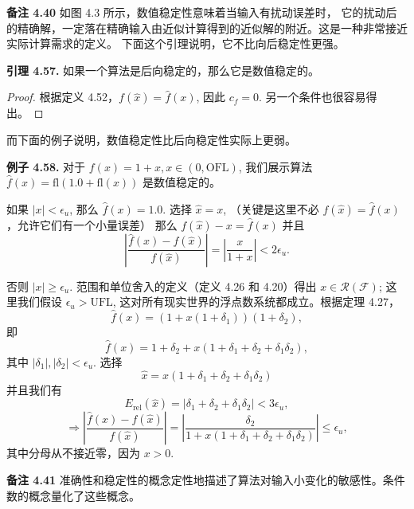 \documentclass[a4paper]{ctexart}
\begin{document}
{\noindent \textbf{备注 4.40 } 如图 4.3 所示，数值稳定性意味着当输入有扰动误差时，
它的扰动后的精确解，一定落在精确输入由近似计算得到的近似解的附近。这是一种非常接近实际计算需求的定义。
下面这个引理说明，它不比向后稳定性更强。


\noindent \textbf{引理 4.57.} 如果一个算法是后向稳定的，那么它是数值稳定的。

\begin{proof}
  根据定义 4.52，$f(\hat{x}) = \hat{f}(x)$, 因此 $c_f = 0$. 另一个条件也很容易得出。
\end{proof}

而下面的例子说明，数值稳定性比后向稳定性实际上更弱。

\noindent \textbf{例子 4.58.} 对于 $f(x) = 1 + x, x \in (0, \text{OFL})$, 我们展示算法 $\hat{f}(x) = \text{fl}(1.0 + \text{fl}(x))$ 是数值稳定的。

如果 $|x| < \epsilon_u$, 那么 $\hat{f}(x) = 1.0$. 
选择 $\hat{x} = x$, （关键是这里不必 $f(\hat{x}) = \hat{f}(x)$，允许它们有一个小量误差）
那么 $f(\hat{x}) - x = \hat{f}(x)$ 并且 
$$
\left|\frac{\hat{f}(x) - f(\hat{x})}{f(\hat{x})}\right| = \left|\frac{x}{1+x}\right| < 2\epsilon_u.
$$

否则 $|x| \geq \epsilon_u$. 范围和单位舍入的定义（定义 4.26 和 4.20）得出 $x \in \mathcal{R}(\mathcal{F})$; 
这里我们假设 $\epsilon_u > \text{UFL}$, 这对所有现实世界的浮点数系统都成立。根据定理 4.27，
$$
\hat{f}(x) = (1 + x(1 + \delta_1))(1 + \delta_2),
$$
即
$$
\hat{f}(x) = 1 + \delta_2 + x(1 + \delta_1 + \delta_2 + \delta_1\delta_2),
$$
其中 $|\delta_1|, |\delta_2| < \epsilon_u$. 选择 
$$
\hat{x} = x(1 + \delta_1 + \delta_2 + \delta_1\delta_2)
$$ 
并且我们有
\[
E_{\text{rel}}(\hat{x}) = |\delta_1 + \delta_2 + \delta_1\delta_2| < 3\epsilon_u,
\]
\[
\Rightarrow \left|\frac{\hat{f}(x) - f(\hat{x})}{f(\hat{x})}\right| 
= \left|\frac{\delta_2}{1 + x(1 + \delta_1 + \delta_2 + \delta_1\delta_2)}\right| \leq \epsilon_u,
\]
其中分母从不接近零，因为 $x > 0$.

\noindent\textbf{备注 4.41 } 准确性和稳定性的概念定性地描述了算法对输入小变化的敏感性。条件数的概念量化了这些概念。


}
\end{document}
